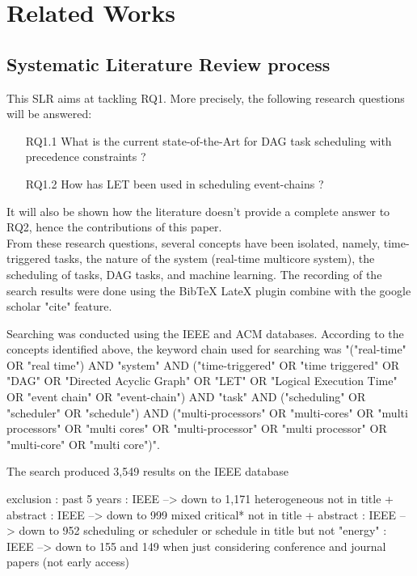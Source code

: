 
\section{Related Works}
\label{sec:literature}

\subsection{Systematic Literature Review process}


This SLR aims at tackling RQ1. More precisely, the following research questions will be answered:

\begin{itemize}
    \item [RQ1.1] What is the current state-of-the-Art for DAG task scheduling with precedence constraints ?
    \item [RQ1.2] How has LET been used in scheduling event-chains ?
\end{itemize}
It will also be shown how the literature doesn't provide 
a complete answer to RQ2, hence the contributions of this paper.\\

From these research questions, several concepts have been isolated,
namely, time-triggered tasks, the nature of the system (real-time multicore system),
the scheduling of tasks, DAG tasks, and machine learning.
The recording of the search results were done using the BibTeX LateX plugin
combine with the google scholar "cite" feature.

Searching was conducted using the IEEE and ACM databases.
According to the concepts identified above, 
the keyword chain used for searching was 
"("real-time" OR "real time") AND 
"system" AND ("time-triggered" OR "time triggered" OR "DAG" OR "Directed Acyclic Graph" OR "LET" OR "Logical Execution Time" OR "event chain" OR "event-chain") 
AND "task" 
AND ("scheduling" OR "scheduler" OR "schedule") 
AND ("multi-processors" OR "multi-cores" OR "multi processors" OR 
"multi cores" OR "multi-processor" OR "multi processor" OR 
"multi-core" OR "multi core")".

The search produced 3,549 results on the IEEE database

exclusion : past 5 years : IEEE --> down to 1,171 
            heterogeneous not in title + abstract : IEEE --> down to 999
            mixed critical* not in title + abstract : IEEE --> down to 952
            scheduling or scheduler or schedule in title but not "energy" :  IEEE --> down to 155 and 149 when just considering conference and journal papers (not early access)
            
